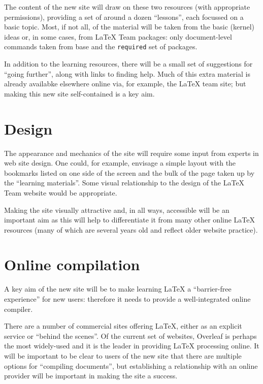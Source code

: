 \documentclass{article}
\begin{document}
The content of the new site will draw on these two resources (with appropriate
permissions), providing a set of around a dozen \enquote{lessons}, each
focussed on a basic topic. Most, if not all, of the material will be taken from
the basic (kernel) ideas or, in some cases, from \LaTeX{} Team packages: only
document-level commands taken from base and the \texttt{required} set of
packages.

In addition to the learning resources, there will be a small set of suggestions
for \enquote{going further}, along with links to finding help. Much of this
extra material is already availabke elsewhere online via, for example, the
\LaTeX{} team site; but making this new site self-contained is a key aim.

\section{Design}

The appearance and mechanics of the site will require some input from experts
in web site design. One could, for example, envisage a simple layout with the
bookmarks listed on one side of the screen and the bulk of the page taken up by
the \enquote{learning materials}. Some visual relationship to the design of the
\LaTeX{} Team website would be appropriate.

Making the site visually attractive and, in all ways, accessible will be an
important aim as this will help to differentiate it from many other online
\LaTeX{} resources (many of which are several years old and reflect older
website practice).

\section{Online compilation}

A key aim of the new site will be to make learning \LaTeX{} a
\enquote{barrier-free experience} for new users: therefore it needs to provide
a well-integrated online compiler.

There are a number of commercial sites offering \LaTeX{}, either as an explicit
service or \enquote{behind the scenes}. Of the current set of websites,
Overleaf is perhaps the most widely-used and it is the leader in providing
\LaTeX{} processing online. It will be important to be clear to users of the
new site that there are multiple options for \enquote{compiling documents}, but
establishing a relationship with an online provider will be important in making
the site a success.
\end{document}
